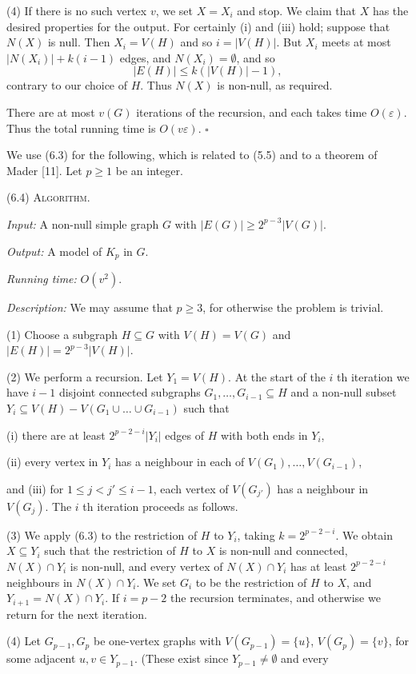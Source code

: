 \hspace*{12pt}(4) If there is no such vertex $v$, we set $X = X_i$ and stop. We claim that $X$ has the desired properties for the output. For certainly (i) and (iii) hold; suppose that $N(X)$ is null. Then $X_i = V(H)$ and so $i = |V(H)|$. But $X_i$ meets at most $|N(X_i)| + k(i-1)$ edges, and $N(X_i) = \emptyset$, and so
\begin{equation*}
|E(H)| \le k(|V(H)| - 1),
\end{equation*}
contrary to our choice of $H$. Thus $N(X)$ is non-null, as required.

There are at most $v(G)$ iterations of the recursion, and each takes time $O(\varepsilon)$. Thus the total running time is $O(v\varepsilon)$. $\square$

We use (6.3) for the following, which is related to (5.5) and to a theorem of Mader [11]. Let $p \ge 1$ be an integer.

\stmt
(6.4) \textsc{Algorithm}.

\textit{Input:} A non-null simple graph $G$ with $|E(G)| \ge 2^{p-3} |V(G)|$.

\textit{Output:} A model of $K_p$ in $G$.

\textit{Running time:} $O(v^2)$.

\textit{Description:} We may assume that $p \ge 3$, for otherwise the problem is trivial.

\hspace*{12pt}(1) Choose a subgraph $H \subseteq G$ with $V(H) = V(G)$ and $|E(H)| = 2^{p-3} |V(H)|$.

\hspace*{12pt}(2) We perform a recursion. Let $Y_1 = V(H)$. At the start of the $i$ th iteration we have $i-1$ disjoint connected subgraphs $G_1, \dots, G_{i-1} \subseteq H$ and a non-null subset $Y_i \subseteq V(H) - V(G_1 \cup \dots \cup G_{i-1})$ such that

\hspace*{12pt}(i) there are at least $2^{p-2-i} |Y_i|$ edges of $H$ with both ends in $Y_i$,

\hspace*{12pt}(ii) every vertex in $Y_i$ has a neighbour in each of $V(G_1), \dots, V(G_{i-1})$,

and (iii) for $1 \le j < j' \le i-1$, each vertex of $V(G_{j'})$ has a neighbour in $V(G_j)$. The $i$ th iteration proceeds as follows.

\hspace*{12pt}(3) We apply (6.3) to the restriction of $H$ to $Y_i$, taking $k = 2^{p-2-i}$. We obtain $X \subseteq Y_i$ such that the restriction of $H$ to $X$ is non-null and connected, $N(X) \cap Y_i$ is non-null, and every vertex of $N(X) \cap Y_i$ has at least $2^{p-2-i}$ neighbours in $N(X) \cap Y_i$. We set $G_i$ to be the restriction of $H$ to $X$, and $Y_{i+1} = N(X) \cap Y_i$. If $i = p-2$ the recursion terminates, and otherwise we return for the next iteration.

\hspace*{12pt}(4) Let $G_{p-1}, G_p$ be one-vertex graphs with $V(G_{p-1}) = \{u\}$, $V(G_p) = \{v\}$, for some adjacent $u, v \in Y_{p-1}$. (These exist since $Y_{p-1} \ne \emptyset$ and every

